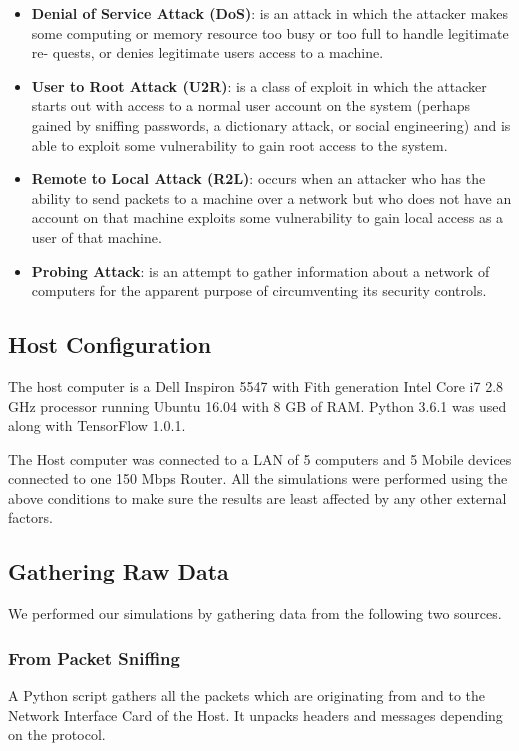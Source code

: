 \documentclass[12pt]{article}
\theoremstyle{definition}
\begin{document}
		\begin{itemize}
			\item \textbf{Denial of Service Attack (DoS)}: is an attack in
			which the attacker makes some computing or memory
			resource too busy or too full to handle legitimate re-
			quests, or denies legitimate users access to a machine.
			\item \textbf{User to Root Attack (U2R)}: is a class of exploit in
			which the attacker starts out with access to a normal
			user account on the system (perhaps gained by sniffing
			passwords, a dictionary attack, or social engineering)
			and is able to exploit some vulnerability to gain root
			access to the system.
			\item  \textbf{Remote to Local Attack (R2L)}: occurs when an
			attacker who has the ability to send packets to a
			machine over a network but who does not have an
			account on that machine exploits some vulnerability to
			gain local access as a user of that machine.
			\item  \textbf{Probing Attack}: is an attempt to gather information
			about a network of computers for the apparent purpose
			of circumventing its security controls.
		\end{itemize}
		
		\subsection{Host Configuration}
		The host computer is a Dell Inspiron 5547 with Fith generation Intel Core i7 2.8 GHz processor running Ubuntu 16.04 with 8 GB of RAM. Python 3.6.1 was used along with TensorFlow 1.0.1.
		
		The Host computer was connected to a LAN of 5 computers and 5 Mobile devices connected to one 150 Mbps Router. All the simulations were performed using the above conditions to make sure the results are least affected by any other external factors.
		
		\subsection{Gathering Raw Data}
		We performed our simulations by gathering data from the following two sources. 
			\subsubsection{From Packet Sniffing}
			A Python script gathers all the packets which are originating from and to the Network Interface Card of the Host. It unpacks headers and messages depending on the protocol.
			
\end{document}
